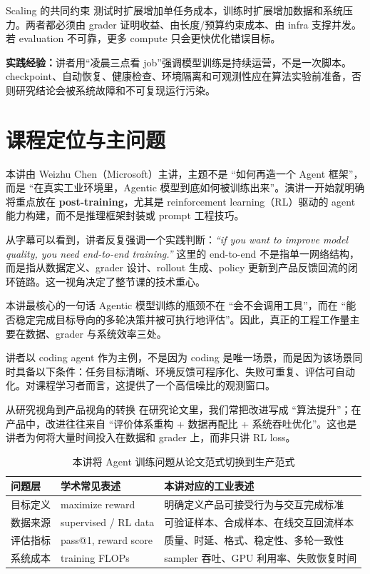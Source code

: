 \documentclass[a4paper]{article}
\begin{document}
\begin{importantbox}{Scaling 的共同约束}
测试时扩展增加单任务成本，训练时扩展增加数据和系统压力。两者都必须由 grader 证明收益、由长度/预算约束成本、由 infra 支撑并发。若 evaluation 不可靠，更多 compute 只会更快优化错误目标。
\end{importantbox}

\textbf{实践经验：}讲者用“凌晨三点看 job”强调模型训练是持续运营，不是一次脚本。checkpoint、自动恢复、健康检查、环境隔离和可观测性应在算法实验前准备，否则研究结论会被系统故障和不可复现运行污染。

\section{课程定位与主问题}

本讲由 Weizhu Chen（Microsoft）主讲，主题不是 ``如何再造一个 Agent 框架''，而是 ``在真实工业环境里，Agentic 模型到底如何被训练出来''。演讲一开始就明确将重点放在 \textbf{post-training}，尤其是 reinforcement learning（RL）驱动的 agent 能力构建，而不是推理框架封装或 prompt 工程技巧。

从字幕可以看到，讲者反复强调一个实践判断：\textit{``if you want to improve model quality, you need end-to-end training.''} 这里的 end-to-end 不是指单一网络结构，而是指从数据定义、grader 设计、rollout 生成、policy 更新到产品反馈回流的闭环链路。这一视角决定了整节课的技术重心。

\begin{importantbox}{本讲最核心的一句话}
Agentic 模型训练的瓶颈不在 ``会不会调用工具''，而在 ``能否稳定完成目标导向的多轮决策并被可执行地评估''。因此，真正的工程工作量主要在数据、grader 与系统效率三处。
\end{importantbox}

讲者以 coding agent 作为主例，不是因为 coding 是唯一场景，而是因为该场景同时具备以下条件：任务目标清晰、环境反馈可程序化、失败可重复、评估可自动化。对课程学习者而言，这提供了一个高信噪比的观测窗口。

\begin{knowledgebox}{从研究视角到产品视角的转换}
在研究论文里，我们常把改进写成 ``算法提升''；在产品中，改进往往来自 ``评价体系重构 + 数据再配比 + 系统吞吐优化''。这也是讲者为何将大量时间投入在数据和 grader 上，而非只讲 RL loss。
\end{knowledgebox}

\begin{table}[H]
\centering
\begin{tabular}{p{2.6cm}p{4.2cm}p{4.7cm}}
\toprule
\textbf{问题层} & \textbf{学术常见表述} & \textbf{本讲对应的工业表述} \\
\midrule
目标定义 & maximize reward & 明确定义产品可接受行为与交互完成标准 \\
数据来源 & supervised / RL data & 可验证样本、合成样本、在线交互回流样本 \\
评估指标 & pass@1, reward score & 质量、时延、格式、稳定性、多轮一致性 \\
系统成本 & training FLOPs & sampler 吞吐、GPU 利用率、失败恢复时间 \\
\bottomrule
\end{tabular}
\caption{本讲将 Agent 训练问题从论文范式切换到生产范式}
\end{table}
\end{document}
